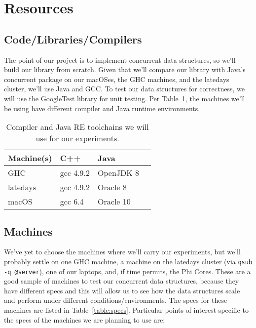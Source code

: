 \documentclass[11pt]{article}
\begin{document}
\section*{Resources}

\subsection*{Code/Libraries/Compilers}
The point of our project is to implement concurrent data structures, so we'll
build our library from scratch. Given that we'll compare our library with Java's
concurrent package on our macOSes, the GHC machines, and the latedays cluster,
we'll use Java and GCC. To test our data structures for correctness, we will use
the \href{https://github.com/google/googletest}{GoogleTest} library for unit
testing. Per Table~\ref{table:compiler}, the machines we'll be using have
different compiler and Java runtime environments.

\begin{table}[t]
\begin{center}
\begin{tabular}{llll}
\toprule
\bf Machine(s) & \bf C++ & \bf Java \\
\midrule
GHC            & gcc 4.9.2 & OpenJDK 8 \\
latedays       & gcc 4.9.2 & Oracle 8 \\
macOS          & gcc 6.4 & Oracle 10 \\
\bottomrule
\end{tabular}
\caption{Compiler and Java RE toolchains we will use for our experiments.}
\label{table:compiler}
\end{center}
\end{table}

\subsection*{Machines}
We've yet to choose the machines where we'll carry our experiments, but we'll
probably settle on one GHC machine, a machine on the latedays cluster (via
\texttt{qsub -q @server}), one of our laptops, and, if time permits, the Phi
Cores. These are a good sample of machines to test our concurrent data
structures, because they have different specs and this will allow us to see how
the data structures scale and perform under different conditions/environments.
The specs for these machines are listed in Table~\ref{table:specs}. Particular
points of interest specific to the specs of the machines we are planning to use
are:
\end{document}
